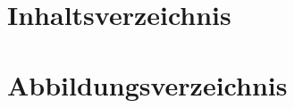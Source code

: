 \documentclass[12pt, a4paper]{article}
\begin{document}



    {\pagestyle{empty}

    

    }
    \newpage





    
    {   
        \setcounter{page}{1}
        \renewcommand{\thesection}{\Roman{section}}

    \section{Inhaltsverzeichnis}        

    \renewcommand{\contentsname}{}

    \setlength\cftbeforesecskip{3pt}
    \renewcommand{\cftsecleader}{\cftdotfill{\cftdotsep}}

    \tableofcontents 

    \newpage


    
        

    \newpage
    


    \section{Abbildungsverzeichnis}

    \renewcommand{\listfigurename}{}

    \listoffigures                      

    }
\end{document}
